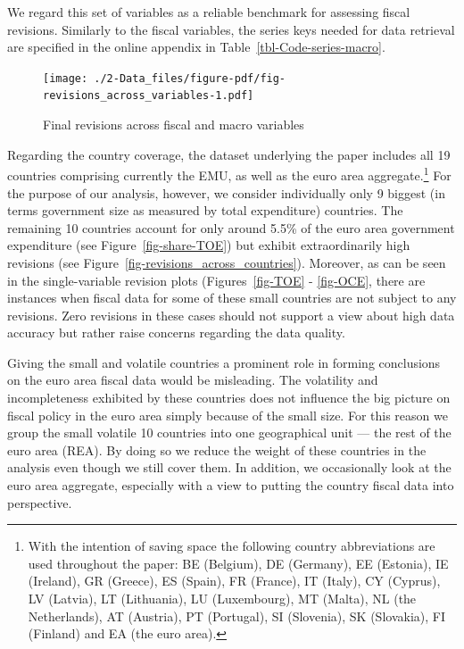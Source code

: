 \documentclass[
  letterpaper,
  authoryear,
  preprint,
  3p]{elsarticle}
\begin{document}
We regard this set of variables as a reliable benchmark for assessing
fiscal revisions. Similarly to the fiscal variables, the series keys
needed for data retrieval are specified in the online appendix in
Table~\ref{tbl-Code-series-macro}.

\begin{figure}[H]

{\centering \texttt{[image: ./2-Data\_files/figure-pdf/fig-revisions\_across\_variables-1.pdf]}

}

\caption{\label{fig-revisions_across_variables}Final revisions across
fiscal and macro variables}

\end{figure}

Regarding the country coverage, the dataset underlying the paper
includes all 19 countries comprising currently the EMU, as well as the
euro area aggregate.\footnote{With the intention of saving space the
  following country abbreviations are used throughout the paper: BE
  (Belgium), DE (Germany), EE (Estonia), IE (Ireland), GR (Greece), ES
  (Spain), FR (France), IT (Italy), CY (Cyprus), LV (Latvia), LT
  (Lithuania), LU (Luxembourg), MT (Malta), NL (the Netherlands), AT
  (Austria), PT (Portugal), SI (Slovenia), SK (Slovakia), FI (Finland)
  and EA (the euro area).} For the purpose of our analysis, however, we
consider individually only 9 biggest (in terms government size as
measured by total expenditure) countries. The remaining 10 countries
account for only around 5.5\% of the euro area government expenditure
(see Figure~\ref{fig-share-TOE}) but exhibit extraordinarily high
revisions (see Figure~\ref{fig-revisions_across_countries}). Moreover,
as can be seen in the single-variable revision plots
(Figures~\ref{fig-TOE} - \ref{fig-OCE}, there are instances when fiscal
data for some of these small countries are not subject to any revisions.
Zero revisions in these cases should not support a view about high data
accuracy but rather raise concerns regarding the data quality.

Giving the small and volatile countries a prominent role in forming
conclusions on the euro area fiscal data would be misleading. The
volatility and incompleteness exhibited by these countries does not
influence the big picture on fiscal policy in the euro area simply
because of the small size. For this reason we group the small volatile
10 countries into one geographical unit --- the rest of the euro area
(REA). By doing so we reduce the weight of these countries in the
analysis even though we still cover them. In addition, we occasionally
look at the euro area aggregate, especially with a view to putting the
country fiscal data into perspective.
\end{document}
